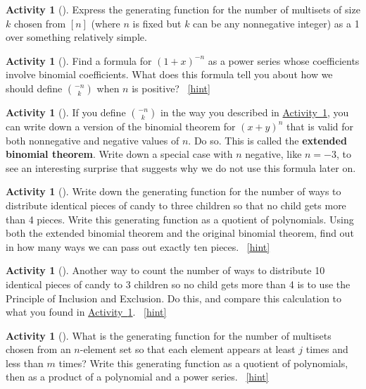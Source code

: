 \documentclass[10pt,]{book}
\newcommand{\terminology}[1]{\textbf{#1}}
\theoremstyle{plain}
\theoremstyle{definition}
\theoremstyle{definition}
\theoremstyle{definition}
\newtheorem{activity}[project]{Activity}
\numberwithin{equation}{chapter}
\begin{document}
\begin{activity}[]\label{multisetgenfn}
\hypertarget{p-1316}{}%
Express the generating function for the number of multisets of size \(k\) chosen from \([n]\) (where \(n\) is fixed but \(k\) can be any nonnegative integer) as a 1 over something relatively simple.%
\end{activity}
\begin{activity}[]\label{negnchoosek}
\hypertarget{p-1319}{}%
Find a formula for \((1+x)^{-n}\) as a power series whose coefficients involve binomial coefficients. What does this formula tell you about how we should define \(\binom{-n}{k}\) when \(n\) is positive?%
~\hfill{\tiny\hyperlink{a-253}{[hint]}\hypertarget{q-253}{}}\end{activity}
\begin{activity}[]\label{activity-247}
\hypertarget{p-1323}{}%
If you define \(\binom{-n}{k}\) in the way you described in \hyperref[negnchoosek]{Activity~\ref{negnchoosek}}, you can write down a version of the binomial theorem for \((x+y)^n\) that is valid for both nonnegative and negative values of \(n\). Do so. This is called the \terminology{extended binomial theorem}. Write down a special case with \(n\) negative, like \(n=-3\), to see an interesting surprise that suggests why we do not use this formula later on.%
\end{activity}
\begin{activity}[]\label{candygenfn}
\hypertarget{p-1325}{}%
Write down the generating function for the number of ways to distribute identical pieces of candy to three children so that no child gets more than 4 pieces. Write this generating function as a quotient of polynomials. Using both the extended binomial theorem and the original binomial theorem, find out in how many ways we can pass out exactly ten pieces.%
~\hfill{\tiny\hyperlink{a-255}{[hint]}\hypertarget{q-255}{}}\end{activity}
\begin{activity}[]\label{activity-249}
\hypertarget{p-1330}{}%
Another way to count the number of ways to distribute 10 identical pieces of candy to 3 children so no child gets more than 4 is to use the Principle of Inclusion and Exclusion.  Do this, and compare this calculation to what you found in \hyperref[candygenfn]{Activity~\ref{candygenfn}}.%
~\hfill{\tiny\hyperlink{a-256}{[hint]}\hypertarget{q-256}{}}\end{activity}
\begin{activity}[]\label{activity-250}
\hypertarget{p-1332}{}%
What is the generating function for the number of multisets chosen from an \(n\)-element set so that each element appears at least \(j\) times and less than \(m\) times? Write this generating function as a quotient of polynomials, then as a product of a polynomial and a power series.%
~\hfill{\tiny\hyperlink{a-257}{[hint]}\hypertarget{q-257}{}}\end{activity}
\typeout{************************************************}
\typeout{************************************************}
\end{document}

